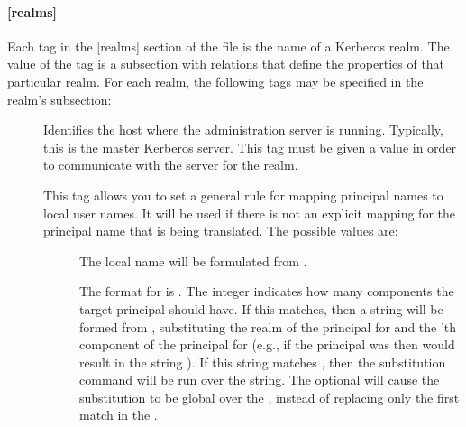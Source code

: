 \documentclass[letterpaper,10pt,english]{sphinxmanual}
\begin{document}
\paragraph{{[}realms{]}}
\label{\detokenize{admin/conf_files/krb5_conf:id2}}\label{\detokenize{admin/conf_files/krb5_conf:realms}}
Each tag in the {[}realms{]} section of the file is the name of a Kerberos
realm.  The value of the tag is a subsection with relations that
define the properties of that particular realm.  For each realm, the
following tags may be specified in the realm’s subsection:
\begin{description}
\item[{}] \leavevmode
Identifies the host where the administration server is running.
Typically, this is the master Kerberos server.  This tag must be
given a value in order to communicate with the {\hyperref[\detokenize{admin/admin_commands/kadmind:kadmind-8}]{}}
server for the realm.

\item[{}] \leavevmode
This tag allows you to set a general rule for mapping principal
names to local user names.  It will be used if there is not an
explicit mapping for the principal name that is being
translated. The possible values are:
\begin{description}
\item[{}] \leavevmode
The local name will be formulated from .

The format for  is \sphinxstylestrong{{[}}\sphinxstylestrong{:}\sphinxstylestrong{{]}(}\sphinxstylestrong{/}.
The integer  indicates how many components the target
principal should have.  If this matches, then a string will be
formed from , substituting the realm of the principal
for  and the ’th component of the principal for
 (e.g., if the principal was  then
\sphinxcode{{[}2:\$2\$1foo{]}} would result in the string
).  If this string matches , then
the  substitution command will be run over the
string.  The optional  will cause the substitution to be
global over the , instead of replacing only the first
match in the .


\end{description}
\end{description}
\end{document}
